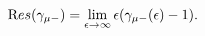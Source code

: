 \begin{equation}
{\text Res}(\gamma_{\mu -})=\lim_{\epsilon\rightarrow \infty}\epsilon(\gamma_{\mu -}(\epsilon)-1).\label{zz.3}
\end{equation}

